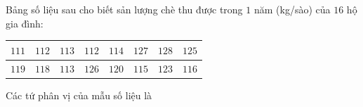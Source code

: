 \begin{ex}
Bảng số liệu sau cho biết sản lượng chè thu được trong $1$ năm (kg/sào) của $16$ hộ gia đình:
\begin{center}
\begin{tabular}{|c|c|c|c|c|c|c|c|}\hline
$111$ & $112$ & $113$ & $112$ & $114$ & $127$ & $128$ & $125$\\\hline
$119$ & $118$ & $113$ & $126$ & $120$ & $115$ & $123$ & $116$\\\hline
\end{tabular}
\end{center}
Các tứ phân vị của mẫu số liệu là
\end{ex}
